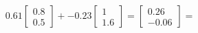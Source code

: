 \documentclass[preview]{standalone}
\begin{document}
\begin{align*}
0.61 \begin{bmatrix} 0.8 \\ 0.5 \end{bmatrix} + -0.23 \begin{bmatrix} 1 \\ 1.6 \end{bmatrix} = \begin{bmatrix} 0.26 \\ -0.06 \end{bmatrix} =
\end{align*}
\end{document}
